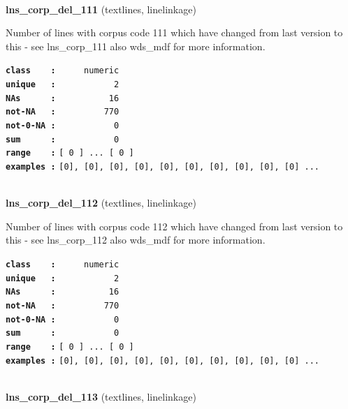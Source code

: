 \documentclass[]{article}
\begin{document}
~

\textbf{lns\_corp\_del\_111} (textlines, linelinkage)

Number of lines with corpus code 111 which have changed from last
version to this - see lns\_corp\_111 also wds\_mdf for more information.

\textbf{\texttt{class\ \ \ \ :}} \texttt{~~~~~numeric}\\
\textbf{\texttt{unique\ \ \ :}} \texttt{~~~~~~~~~~~2}\\
\textbf{\texttt{NAs\ \ \ \ \ \ :}} \texttt{~~~~~~~~~~16}\\
\textbf{\texttt{not-NA\ \ \ :}} \texttt{~~~~~~~~~770}\\
\textbf{\texttt{not-0-NA\ :}} \texttt{~~~~~~~~~~~0}\\
\textbf{\texttt{sum\ \ \ \ \ \ :}} \texttt{~~~~~~~~~~~0}\\
\textbf{\texttt{range\ \ \ \ :}}
\texttt{{[}\ 0\ {]}\ ...\ {[}\ 0\ {]}}\\
\textbf{\texttt{examples\ :}}
\texttt{{[}0{]},\ {[}0{]},\ {[}0{]},\ {[}0{]},\ {[}0{]},\ {[}0{]},\ {[}0{]},\ {[}0{]},\ {[}0{]},\ {[}0{]}\ ...}\\

~

\textbf{lns\_corp\_del\_112} (textlines, linelinkage)

Number of lines with corpus code 112 which have changed from last
version to this - see lns\_corp\_112 also wds\_mdf for more information.

\textbf{\texttt{class\ \ \ \ :}} \texttt{~~~~~numeric}\\
\textbf{\texttt{unique\ \ \ :}} \texttt{~~~~~~~~~~~2}\\
\textbf{\texttt{NAs\ \ \ \ \ \ :}} \texttt{~~~~~~~~~~16}\\
\textbf{\texttt{not-NA\ \ \ :}} \texttt{~~~~~~~~~770}\\
\textbf{\texttt{not-0-NA\ :}} \texttt{~~~~~~~~~~~0}\\
\textbf{\texttt{sum\ \ \ \ \ \ :}} \texttt{~~~~~~~~~~~0}\\
\textbf{\texttt{range\ \ \ \ :}}
\texttt{{[}\ 0\ {]}\ ...\ {[}\ 0\ {]}}\\
\textbf{\texttt{examples\ :}}
\texttt{{[}0{]},\ {[}0{]},\ {[}0{]},\ {[}0{]},\ {[}0{]},\ {[}0{]},\ {[}0{]},\ {[}0{]},\ {[}0{]},\ {[}0{]}\ ...}\\

~

\textbf{lns\_corp\_del\_113} (textlines, linelinkage)
\end{document}
